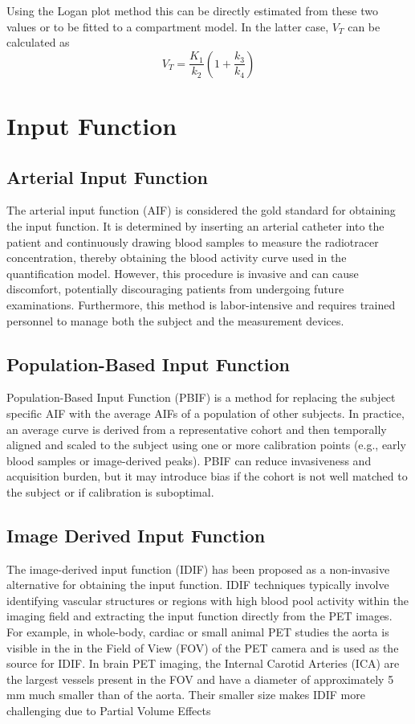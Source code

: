 Using the Logan plot method this can be directly estimated from these two values or to be fitted to a compartment model.
In the latter case, $V_T$ can be calculated as
\[
	V_T = \frac{K_1}{k_2} (1+\frac{k_3}{k_4})
\]

\section{Input Function}

\subsection{Arterial Input Function}
The arterial input function (AIF) is considered the gold standard for obtaining the input function.
It is determined by inserting an arterial catheter into the patient and continuously drawing blood samples to measure the radiotracer concentration, thereby obtaining the blood activity curve used in the quantification model.
However, this procedure is invasive and can cause discomfort, potentially discouraging patients from undergoing future examinations.
Furthermore, this method is labor-intensive and requires trained personnel to manage both the subject and the measurement devices.

\subsection{Population-Based Input Function}
Population-Based Input Function (PBIF) is a method for replacing the subject specific AIF with the average AIFs of a population of other subjects.
In practice, an average curve is derived from a representative cohort and then temporally aligned and scaled to the subject using one or more calibration points (e.g., early blood samples or image-derived peaks).
PBIF can reduce invasiveness and acquisition burden, but it may introduce bias if the cohort is not well matched to the subject or if calibration is suboptimal.

\subsection{Image Derived Input Function}
The image-derived input function (IDIF) has been proposed as a non-invasive alternative for obtaining the input function.
IDIF techniques typically involve identifying vascular structures or regions with high blood pool activity within the imaging field and extracting the input function directly from the PET images.
For example, in whole-body, cardiac or small animal PET studies the aorta is visible in the in the Field of View (FOV) of the PET camera and is used as the source for IDIF.
In brain PET imaging, the Internal Carotid Arteries (ICA) are the largest vessels present in the FOV and have a diameter of approximately 5 mm much smaller than of the aorta.
Their smaller size makes IDIF more challenging due to Partial Volume Effects

